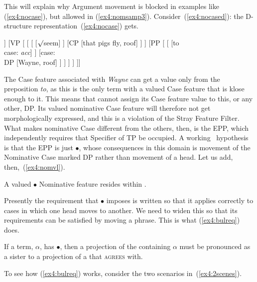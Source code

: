 This will explain why Argument movement is blocked in examples like (\ref{ex4:nocase}), but allowed in (\ref{ex4:nomsamp3}). Consider~(\ref{ex4:nocased}): the D-structure representation~(\ref{ex4:nocase}) gets.
\begin{exe}
\ex \label{ex4:nocased}
\small
\begin{forest}
[TP
	[\obar{T} [past\\ $\bullet$case: \emph{nom}]]
	[VP [ 
		[ 
			[ [$\surd$seem] ]
			[CP [that pigs fly, roof] ]
		 ]
		[PP [
			[ [to\\ case: \emph{acc}] ]
			[case: \\DP [Wayne, roof] ]
		] ]
	]
]]
\end{forest}
\end{exe}
The Case feature associated with \emph{Wayne} can get a value only from the preposition \emph{to}, as this is the only term with a valued Case feature that is klose enough to it. This means that  cannot assign its Case feature value to this, or any other, DP. Its valued nominative Case feature will therefore not get morphologically expressed, and this is a violation of the Stray Feature Filter. What makes nominative Case different from the others, then, is the EPP, which independently requires that Specifier of TP be occupied. A working%
%
%
%
\ hypothesis is that the EPP is just $\bullet$, whose consequences in this domain is movement of the Nominative Case marked DP rather than movement of a head. Let us add, then,~(\ref{ex4:nomvl}).
\begin{exe}
\raggedright
	\ex \label{ex4:nomvl} A valued $\bullet$ Nominative feature resides within .
\end{exe}
Presently the requirement that $\bullet$ imposes is written so that it applies correctly to cases in which one head moves to another. We need to widen this so that its requirements can be satisfied by moving a phrase. This is what (\ref{ex4:bulreq}) does.
\begin{exe}
\raggedright
	\ex \label{ex4:bulreq} If a term, $\alpha$, has $\bullet$, then a projection of the  containing $\alpha$ must be pronounced as a sister to a projection of a  that  \textsc{agrees} with.
\end{exe}
To see how (\ref{ex4:bulreq}) works, consider the two scenarios in~(\ref{ex4:2scenes}).
